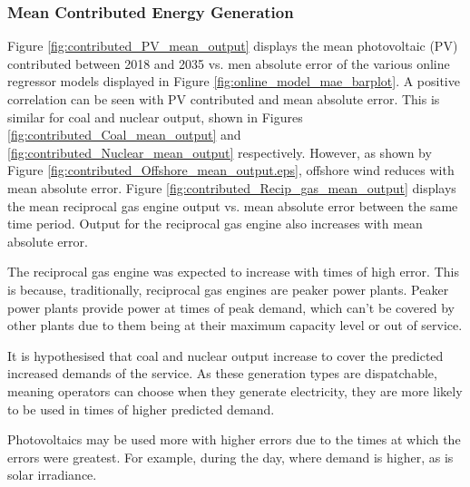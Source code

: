 \documentclass[final,3p,times,twocolumn,numbers]{elsarticle}
\begin{document}
\subsubsection{Mean Contributed Energy Generation}


Figure \ref{fig:contributed_PV_mean_output} displays the mean photovoltaic (PV) contributed between 2018 and 2035 vs. men absolute error of the various online regressor models displayed in Figure \ref{fig:online_model_mae_barplot}. A positive correlation can be seen with PV contributed and mean absolute error. This is similar for coal and nuclear output, shown in Figures \ref{fig:contributed_Coal_mean_output} and \ref{fig:contributed_Nuclear_mean_output} respectively. However, as shown by Figure \ref{fig:contributed_Offshore_mean_output.eps}, offshore wind reduces with mean absolute error. Figure \ref{fig:contributed_Recip_gas_mean_output} displays the mean reciprocal gas engine output vs. mean absolute error between the same time period. Output for the reciprocal gas engine also increases with mean absolute error.

The reciprocal gas engine was expected to increase with times of high error. This is because, traditionally, reciprocal gas engines are peaker power plants. Peaker power plants provide power at times of peak demand, which can't be covered by other plants due to them being at their maximum capacity level or out of service.

It is hypothesised that coal and nuclear output increase to cover the predicted increased demands of the service. As these generation types are dispatchable, meaning operators can choose when they generate electricity, they are more likely to be used in times of higher predicted demand.

Photovoltaics may be used more with higher errors due to the times at which the errors were greatest. For example, during the day, where demand is higher, as is solar irradiance.
\end{document}

